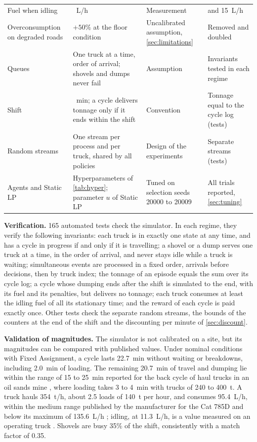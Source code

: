 \documentclass[11pt,a4paper]{article}
\newif\ifcorrmarks
\newenvironment{corrbloc}{\par\ifcorrmarks\color{corrcolor}\fi}{\par}
\begin{document}
\begin{corrbloc}
\begin{table}[H]
\begin{tabularx}{\textwidth}{>{\raggedright\arraybackslash}p{2.7cm}>{\raggedright\arraybackslash}X>{\raggedright\arraybackslash}p{3.1cm}>{\raggedright\arraybackslash}p{3.3cm}}
Fuel when idling & 11.3~L/h & Measurement \cite{Kubler2015} & 8 and 15~L/h \\
Overconsumption on degraded roads & $+50\%$ at the floor condition & Uncalibrated assumption, \cref{sec:limitations} & Removed and doubled \\
Queues & One truck at a time, order of arrival; shovels and dumps never fail & Assumption & Invariants tested in each regime \\
Shift & 480~min; a cycle delivers tonnage only if it ends within the shift & Convention & Tonnage equal to the cycle log (tests) \\
Random streams & One stream per process and per truck, shared by all policies & Design of the experiments & Separate streams (tests) \\
Agents and Static LP & Hyperparameters of \cref{tab:hyper}; parameter $u$ of Static LP & Tuned on selection seeds 20000 to 20009 & All trials reported, \cref{sec:tuning} \\
\bottomrule
\end{tabularx}
\end{table}

\textbf{Verification.} 165 automated tests check the simulator. In each regime, they verify the following invariants: each truck is in exactly one state at any time, and has a cycle in progress if and only if it is travelling; a shovel or a dump serves one truck at a time, in the order of arrival, and never stays idle while a truck is waiting; simultaneous events are processed in a fixed order, arrivals before decisions, then by truck index; the tonnage of an episode equals the sum over its cycle log; a cycle whose dumping ends after the shift is simulated to the end, with its fuel and its penalties, but delivers no tonnage; each truck consumes at least the idling fuel of all its stationary time; and the reward of each cycle is paid exactly once. Other tests check the separate random streams, the bounds of the counters at the end of the shift and the discounting per minute of \cref{sec:discount}.

\textbf{Validation of magnitudes.} The simulator is not calibrated on a site, but its magnitudes can be compared with published values. Under nominal conditions with Fixed Assignment, a cycle lasts 22.7~min without waiting or breakdowns, including 2.0~min of loading. The remaining 20.7~min of travel and dumping lie within the range of 15 to 25~min reported for the back cycle of haul trucks in an oil sands mine \cite{ChungTa2013}, where loading takes 3 to 4~min with trucks of 240 to 400~t. A truck hauls 354~t/h, about 2.5 loads of 140~t per hour, and consumes 95.4~L/h, within the medium range published by the manufacturer for the Cat 785D and below its maximum of 135.6~L/h \cite{Caterpillar2019}; idling, at 11.3~L/h, is a value measured on an operating truck \cite{Kubler2015}. Shovels are busy 35\% of the shift, consistently with a match factor of 0.35.


\end{corrbloc}
\end{document}
